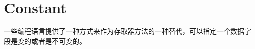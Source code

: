 \section{Constant}

一些编程语言提供了一种方式来作为存取器方法的一种替代，可以指定一个数据字段是变的或者是不可变的。


\begin{lstlisting}[language=C++]

\end{lstlisting}





\begin{lstlisting}[language=C++]

\end{lstlisting}






\begin{lstlisting}[language=C++]

\end{lstlisting}






\begin{lstlisting}[language=C++]

\end{lstlisting}






\begin{lstlisting}[language=C++]

\end{lstlisting}






\begin{lstlisting}[language=C++]

\end{lstlisting}






\begin{lstlisting}[language=C++]

\end{lstlisting}






\begin{lstlisting}[language=C++]

\end{lstlisting}







